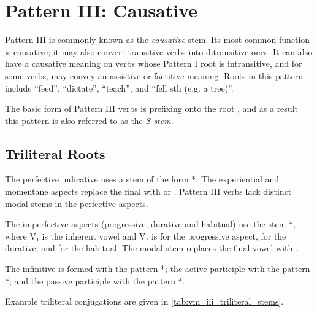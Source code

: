 \documentclass[grammar]{subfiles}
\begin{document}
\clearpage
\section{Pattern III: Causative}
\label{sec:vm_pattern_iii}

Pattern III is commonly known as the \emph{causative} stem.  Its most common
function is causative; it may also convert transitive verbs into ditransitive
ones.  It can also have a causative meaning on verbs whose Pattern I root is
intransitive, and for some verbs, may convey an assistive or factitive meaning.
Roots in this pattern include  “feed”,  “dictate”,
 “teach”, and  “fell sth (e.g. a tree)”.

The basic form of Pattern III verbs is prefixing  onto the root
, and as a result this pattern is also referred to as the
\emph{S-stem}. 



\subsection{Triliteral Roots}
\label{ssec:vm_iii_triliteral}

The perfective indicative uses a stem of the form *. The
experiential and momentane aspects replace the final  with  or
.  Pattern III verbs lack distinct modal stems in the perfective aspects.  

The imperfective aspects (progressive, durative and  habitual) use the stem
*, where V₁ is the inherent vowel and V₂ is  for the
progressive aspect,  for the durative, and  for the habitual.
The modal stem replaces the final vowel with . 

The infinitive is formed with the pattern *; the active participle
with the pattern *; and the passive participle with the pattern
*.

Example triliteral conjugations are given in \cref{tab:vm_iii_triliteral_stems}. 
\end{document}
